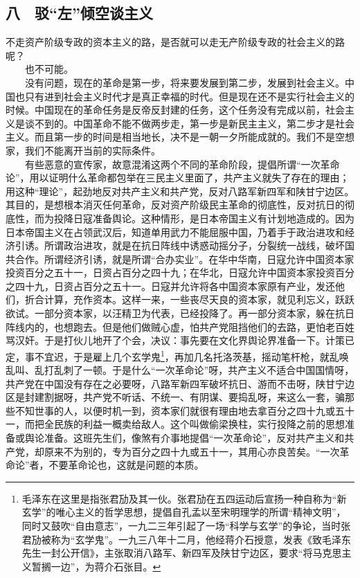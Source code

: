 \documentclass[cn,11pt,chinese]{elegantbook}
\def\myformat#1{\hfil\hfil #1}
\begin{document}
\subsection*{\myformat{八　驳“左”倾空谈主义}}
不走资产阶级专政的资本主义的路，是否就可以走无产阶级专政的社会主义的路呢？\\
　　也不可能。\\
　　没有问题，现在的革命是第一步，将来要发展到第二步，发展到社会主义。中国也只有进到社会主义时代才是真正幸福的时代。但是现在还不是实行社会主义的时候。中国现在的革命任务是反帝反封建的任务，这个任务没有完成以前，社会主义是谈不到的。中国革命不能不做两步走，第一步是新民主主义，第二步才是社会主义。而且第一步的时间是相当地长，决不是一朝一夕所能成就的。我们不是空想家，我们不能离开当前的实际条件。\\
　　有些恶意的宣传家，故意混淆这两个不同的革命阶段，提倡所谓“一次革命论”，用以证明什么革命都包举在三民主义里面了，共产主义就失了存在的理由；用这种“理论”，起劲地反对共产主义和共产党，反对八路军新四军和陕甘宁边区。其目的，是想根本消灭任何革命，反对资产阶级民主革命的彻底性，反对抗日的彻底性，而为投降日寇准备舆论。这种情形，是日本帝国主义有计划地造成的。因为日本帝国主义在占领武汉后，知道单用武力不能屈服中国，乃着手于政治进攻和经济引诱。所谓政治进攻，就是在抗日阵线中诱惑动摇分子，分裂统一战线，破坏国共合作。所谓经济引诱，就是所谓“合办实业”。在华中华南，日寇允许中国资本家投资百分之五十一，日资占百分之四十九；在华北，日寇允许中国资本家投资百分之四十九，日资占百分之五十一。日寇并允许将各中国资本家原有产业，发还他们，折合计算，充作资本。这样一来，一些丧尽天良的资本家，就见利忘义，跃跃欲试。一部分资本家，以汪精卫为代表，已经投降了。再一部分资本家，躲在抗日阵线内的，也想跑去。但是他们做贼心虚，怕共产党阻挡他们的去路，更怕老百姓骂汉奸。于是打伙儿地开了个会，决议：事先要在文化界舆论界准备一下。计策已定，事不宜迟，于是雇上几个玄学鬼\footnote[19]{ 毛泽东在这里是指张君劢及其一伙。张君劢在五四运动后宣扬一种自称为“新玄学”的唯心主义的哲学思想，提倡自孔孟以至宋明理学的所谓“精神文明”，同时又鼓吹“自由意志”，一九二三年引起了一场“科学与玄学”的争论，当时张君劢被称为“玄学鬼”。一九三八年十二月，他经蒋介石授意，发表《致毛泽东先生一封公开信》，主张取消八路军、新四军及陕甘宁边区，要求“将马克思主义暂搁一边”，为蒋介石张目。}，再加几名托洛茨基，摇动笔杆枪，就乱唤乱叫、乱打乱刺了一顿。于是什么“一次革命论”呀，共产主义不适合中国国情呀，共产党在中国没有存在之必要呀，八路军新四军破坏抗日、游而不击呀，陕甘宁边区是封建割据呀，共产党不听话、不统一、有阴谋、要捣乱呀，来这么一套，骗那些不知世事的人，以便时机一到，资本家们就很有理由地去拿百分之四十九或五十一，而把全民族的利益一概卖给敌人。这个叫做偷梁换柱，实行投降之前的思想准备或舆论准备。这班先生们，像煞有介事地提倡“一次革命论”，反对共产主义和共产党，却原来不为别的，专为百分之四十九或五十一，其用心亦良苦矣。“一次革命论”者，不要革命论也，这就是问题的本质。\\
\end{document}

